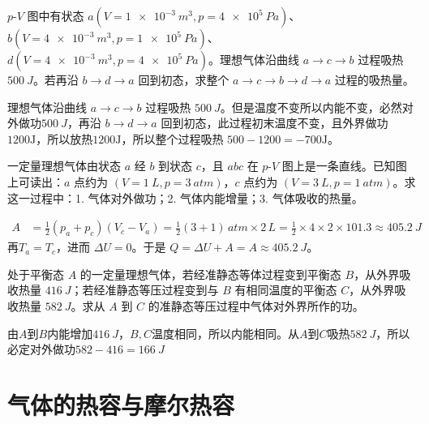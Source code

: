 \documentclass[lang=cn,11pt]{elegantbook}
\begin{document}
\begin{exercise}[2015-2016期末：已知一路吸热时怎样求闭合路径吸热]
\(p\)-\(V\) 图中有状态 \(a( V=\SI{1e-3}{m^3},p=\SI{4e5}{Pa})\)、\(b( V=\SI{4e-3}{m^3},p=\SI{1e5}{Pa})\)、\(d( V=\SI{4e-3}{m^3},p=\SI{4e5}{Pa})\)。理想气体沿曲线 \(a\to c\to b\) 过程吸热 \(\SI{500}{J}\)。若再沿 \(b\to d\to a\) 回到初态，求整个 \(a\to c\to b\to d\to a\) 过程的吸热量。
\end{exercise}
\begin{solution}
理想气体沿曲线 \(a\to c\to b\) 过程吸热 \(\SI{500}{J}\)。但是温度不变所以内能不变，必然对外做功\(\SI{500}{J}\)，再沿 \(b\to d\to a\) 回到初态，此过程初末温度不变，且外界做功$1200\text{J}$，所以放热$1200\text{J}$，所以整个过程吸热 \(500-1200=-700\text{J}\)。
\end{solution}

\begin{exercise}[\(p\)-\(V\) 图上一条直线过程为什么能先看面积和温度]
一定量理想气体由状态 \(a\) 经 \(b\) 到状态 \(c\)，且 \(abc\) 在 \(p\)-\(V\) 图上是一条直线。已知图上可读出：\(a\) 点约为 \((V=\SI{1}{L},p=\SI{3}{atm})\)，\(c\) 点约为 \((V=\SI{3}{L},p=\SI{1}{atm})\)。求这一过程中：1. 气体对外做功；2. 气体内能增量；3. 气体吸收的热量。
\end{exercise}

\begin{solution}
\[
\begin{aligned}
A&=\frac12(p_a+p_c)(V_c-V_a)=\frac12(3+1)\,\si{atm}\times 2\,\si{L}=\frac12\times4\times2\times101.3\approx \SI{405.2}{J}
\end{aligned}
\]
再\(T_a=T_c\)，进而 \(\Delta U=0\)。于是 \(Q=\Delta U+A=A\approx \SI{405.2}{J}\)。
\end{solution}

\begin{exercise}
处于平衡态 \(A\) 的一定量理想气体，若经准静态等体过程变到平衡态 \(B\)，从外界吸收热量 \(\SI{416}{J}\)；若经准静态等压过程变到与 \(B\) 有相同温度的平衡态 \(C\)，从外界吸收热量 \(\SI{582}{J}\)。求从 \(A\) 到 \(C\) 的准静态等压过程中气体对外界所作的功。
\end{exercise}

\begin{solution}
由$A$到$B$内能增加\(\SI{416}{J}\)，$B,C$温度相同，所以内能相同。从$A$到$C$吸热\(\SI{582}{J}\)，所以必定对外做功$582-416 =\SI{166}{J}$ 
\end{solution}

\section{气体的热容与摩尔热容}
\end{document}
